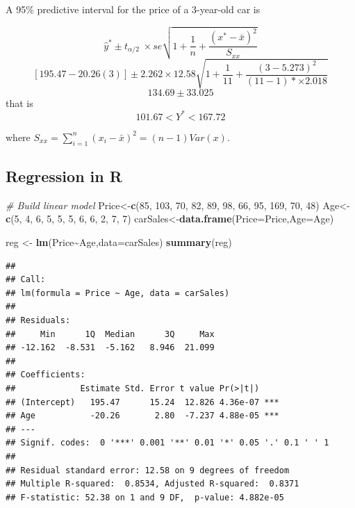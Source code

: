 \documentclass[
]{article}
\newenvironment{Shaded}{\begin{snugshade}}{\end{snugshade}}
\newcommand{\AttributeTok}[1]{\textcolor[rgb]{0.13,0.29,0.53}{#1}}
\newcommand{\CommentTok}[1]{\textcolor[rgb]{0.56,0.35,0.01}{\textit{#1}}}
\newcommand{\DecValTok}[1]{\textcolor[rgb]{0.00,0.00,0.81}{#1}}
\newcommand{\FunctionTok}[1]{\textcolor[rgb]{0.13,0.29,0.53}{\textbf{#1}}}
\newcommand{\NormalTok}[1]{#1}
\newcommand{\OtherTok}[1]{\textcolor[rgb]{0.56,0.35,0.01}{#1}}
\newcommand{\SpecialCharTok}[1]{\textcolor[rgb]{0.81,0.36,0.00}{\textbf{#1}}}
\begin{document}
A 95\% predictive interval for the price of a 3-year-old car is

\[\hat{y}^*\pm t_{\alpha/2}\;\times se\sqrt{1+\frac{1}{n}+\frac{(x^*-\bar{x})^2}{S_{xx}}}\]
\[[195.47-20.26(3)]\pm 2.262\times12.58\sqrt{1+\frac{1}{11}+\frac{(3-5.273)^2}{(11-1)*\times2.018}}\]
\[134.69\pm 33.025\] that is \[101.67<Y^*<167.72\]

where \(S_{xx}=\sum_{i=1}^{n} (x_i-\bar{x})^2=(n-1) Var(x)\).

\hypertarget{regression-in-r}{%
\subsection{Regression in R}\label{regression-in-r}}

\begin{Shaded}
\begin{Highlighting}[]
\CommentTok{\# Build linear model }
\NormalTok{Price}\OtherTok{\textless{}{-}}\FunctionTok{c}\NormalTok{(}\DecValTok{85}\NormalTok{, }\DecValTok{103}\NormalTok{,  }\DecValTok{70}\NormalTok{,  }\DecValTok{82}\NormalTok{,  }\DecValTok{89}\NormalTok{,  }\DecValTok{98}\NormalTok{,  }\DecValTok{66}\NormalTok{,  }\DecValTok{95}\NormalTok{, }\DecValTok{169}\NormalTok{,  }\DecValTok{70}\NormalTok{,  }\DecValTok{48}\NormalTok{)}
\NormalTok{Age}\OtherTok{\textless{}{-}} \FunctionTok{c}\NormalTok{(}\DecValTok{5}\NormalTok{, }\DecValTok{4}\NormalTok{, }\DecValTok{6}\NormalTok{, }\DecValTok{5}\NormalTok{, }\DecValTok{5}\NormalTok{, }\DecValTok{5}\NormalTok{, }\DecValTok{6}\NormalTok{, }\DecValTok{6}\NormalTok{, }\DecValTok{2}\NormalTok{, }\DecValTok{7}\NormalTok{, }\DecValTok{7}\NormalTok{)}
\NormalTok{carSales}\OtherTok{\textless{}{-}}\FunctionTok{data.frame}\NormalTok{(}\AttributeTok{Price=}\NormalTok{Price,}\AttributeTok{Age=}\NormalTok{Age)}

\NormalTok{reg }\OtherTok{\textless{}{-}} \FunctionTok{lm}\NormalTok{(Price}\SpecialCharTok{\textasciitilde{}}\NormalTok{Age,}\AttributeTok{data=}\NormalTok{carSales)}
\FunctionTok{summary}\NormalTok{(reg)}
\end{Highlighting}
\end{Shaded}

\begin{verbatim}
## 
## Call:
## lm(formula = Price ~ Age, data = carSales)
## 
## Residuals:
##     Min      1Q  Median      3Q     Max 
## -12.162  -8.531  -5.162   8.946  21.099 
## 
## Coefficients:
##             Estimate Std. Error t value Pr(>|t|)    
## (Intercept)   195.47      15.24  12.826 4.36e-07 ***
## Age           -20.26       2.80  -7.237 4.88e-05 ***
## ---
## Signif. codes:  0 '***' 0.001 '**' 0.01 '*' 0.05 '.' 0.1 ' ' 1
## 
## Residual standard error: 12.58 on 9 degrees of freedom
## Multiple R-squared:  0.8534, Adjusted R-squared:  0.8371 
## F-statistic: 52.38 on 1 and 9 DF,  p-value: 4.882e-05
\end{verbatim}
\end{document}
